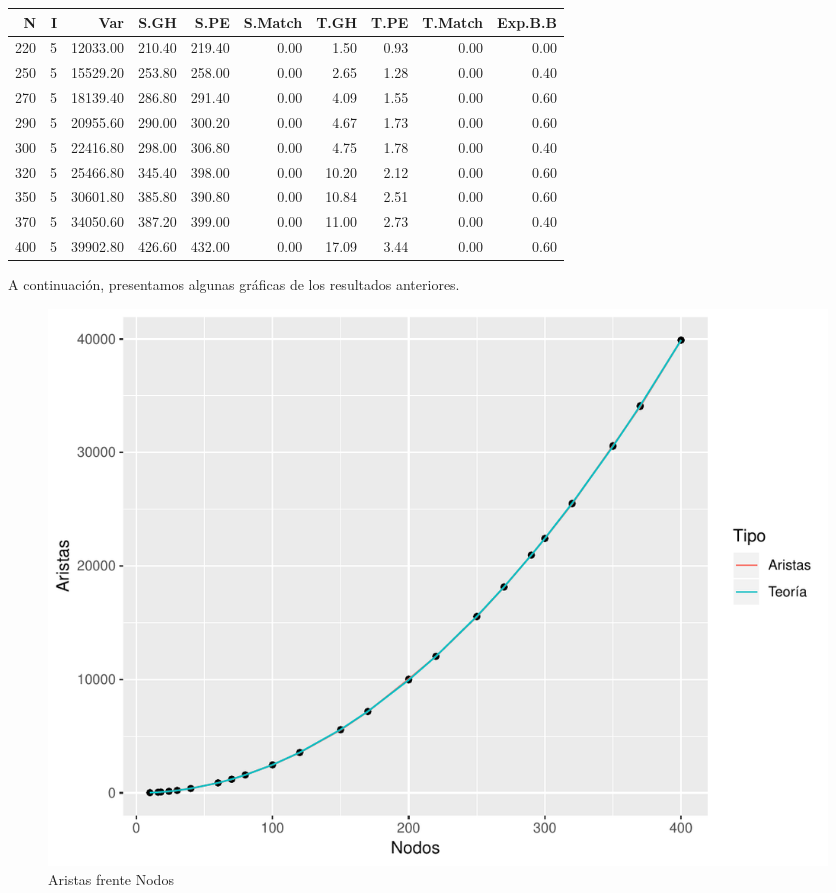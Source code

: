 \documentclass[twoside,a4paper,openright,12pt,tikz]{book}
\begin{document}
\begin{table}[h]
\centering
\begin{tabular}{rrrrrrrrrr}
  \hline
N & I & Var & S.GH & S.PE & S.Match & T.GH & T.PE & T.Match & Exp.B.B \\ 
  \hline 
  220 &   5 & 12033.00 & 210.40 & 219.40 & 0.00 & 1.50 & 0.93 & 0.00 & 0.00 \\ 
  250 &   5 & 15529.20 & 253.80 & 258.00 & 0.00 & 2.65 & 1.28 & 0.00 & 0.40 \\ 
  270 &   5 & 18139.40 & 286.80 & 291.40 & 0.00 & 4.09 & 1.55 & 0.00 & 0.60 \\ 
290 &     5 & 20955.60 & 290.00 & 300.20 & 0.00 & 4.67 & 1.73 & 0.00 & 0.60 \\ 
  300 &   5 & 22416.80 & 298.00 & 306.80 & 0.00 & 4.75 & 1.78 & 0.00 & 0.40 \\ 
320 &   5   & 25466.80 & 345.40 & 398.00 & 0.00 & 10.20 & 2.12 & 0.00 & 0.60\\
  350 &   5 & 30601.80 & 385.80 & 390.80 & 0.00 & 10.84 & 2.51 & 0.00 & 0.60\\
  370 &   5 & 34050.60 & 387.20 & 399.00 & 0.00 & 11.00 & 2.73 & 0.00 & 0.40\\
  400 &   5 & 39902.80 & 426.60 & 432.00 & 0.00 & 17.09 & 3.44 & 0.00 & 0.60 \\ 
   \hline
 
\end{tabular}
\end{table}
\newpage
A continuación, presentamos algunas gráficas de los resultados anteriores.
\begin{figure}[h]
\centering
\includegraphics[scale=0.75]{plot1}
\caption{Aristas frente Nodos}
\end{figure}
\end{document}
